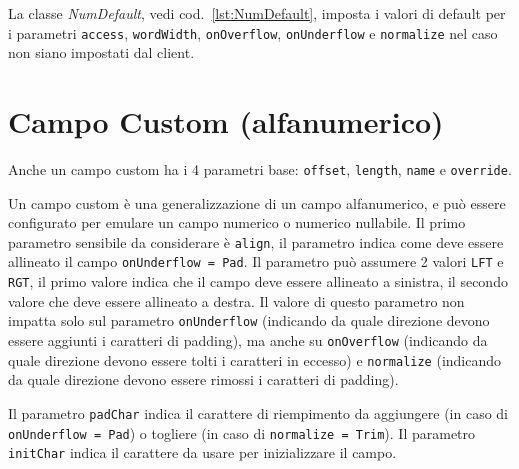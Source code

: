 La classe \textsl{NumDefault}, vedi cod.~\ref{lst:NumDefault}, imposta i valori
di default per i parametri \verb!access!, \verb!wordWidth!, \texttt{onOver\-flow}, 
\verb!onUnderflow! e \verb!normalize! nel caso non siano  impostati dal client.


\section{Campo Custom (alfanumerico)}
Anche un campo custom ha i 4 parametri base: \verb!offset!, \verb!length!,
\verb!name! e \verb!override!.

Un campo custom è una generalizzazione di un campo alfanumerico, e può essere 
configurato per emulare un campo numerico o numerico nullabile.
Il primo parametro sensibile da considerare è \verb!align!, il parametro indica
come deve essere allineato il campo \texttt{onUnderflow = Pad}.
Il parametro può assumere 2 valori \verb!LFT! e \verb!RGT!, il primo valore 
indica che il campo deve essere allineato a sinistra, il secondo valore che 
deve essere allineato a destra.
Il valore di questo parametro non impatta solo sul parametro \verb!onUnderflow!
(indicando da quale direzione devono essere aggiunti i caratteri di padding),
ma anche su \verb!onOverflow! (indicando da quale direzione devono essere tolti
i caratteri in eccesso) e \verb!normalize! (indicando da quale direzione devono
essere rimossi i caratteri di padding).

Il parametro \verb!padChar! indica il carattere di riempimento da aggiungere
(in caso di \texttt{onUnderflow = Pad}) o togliere (in caso di 
\texttt{normalize = Trim}).
Il parametro \verb!initChar! indica il carattere da usare per inizializzare il
campo.

